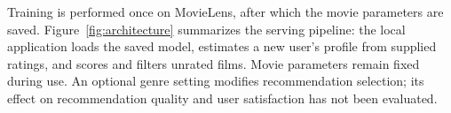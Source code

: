 Training is performed once on MovieLens, after which the movie parameters are saved. Figure~\ref{fig:architecture} summarizes the serving pipeline: the local application loads the saved model, estimates a new user's profile from supplied ratings, and scores and filters unrated films. Movie parameters remain fixed during use. An optional genre setting modifies recommendation selection; its effect on recommendation quality and user satisfaction has not been evaluated.


